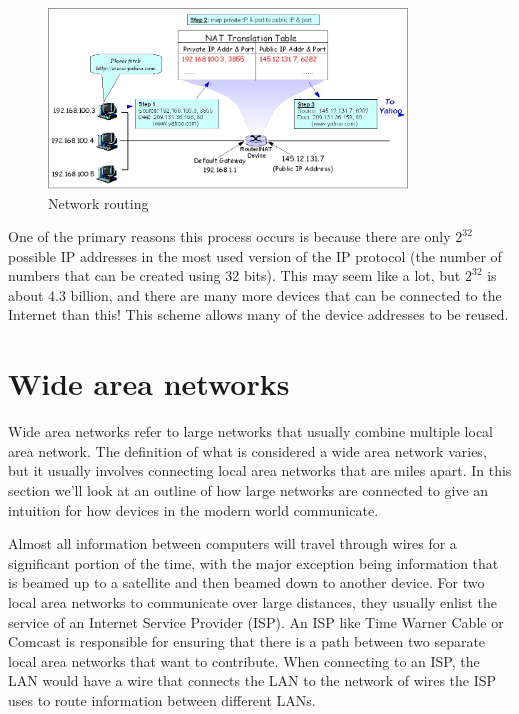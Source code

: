 \begin{figure}
	\centering
	\includegraphics[width=0.85\textwidth]{images/routingExample.png}
	\caption{Network routing}
	\label{fig:windows:file}
\end{figure}


One of the primary reasons this process occurs is because there are only $2^{32}$ possible IP addresses in the most used version of the IP protocol (the number of numbers that can be created using 32 bits). This may seem like a lot, but $2^{32}$ is about 4.3 billion, and there are many more devices that can be connected to the Internet than this! This scheme allows many of the device addresses to be reused.

\section{Wide area networks}

Wide area networks refer to large networks that usually combine multiple local area network. The definition of what is considered a wide area network varies, but it usually involves connecting local area networks that are miles apart. In this section we’ll look at an outline of how large networks are connected to give an intuition for how devices in the modern world communicate.

Almost all information between computers will travel through wires for a significant portion of the time, with the major exception being information that is beamed up to a satellite and then beamed down to another device. For two local area networks to communicate over large distances, they usually enlist the service of an Internet Service Provider (ISP). An ISP like Time Warner Cable or Comcast is responsible for ensuring that there is a path between two separate local area networks that want to contribute. When connecting to an ISP, the LAN would have a wire that connects the LAN to the network of wires the ISP uses to route information between different LANs.

